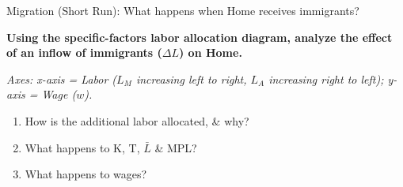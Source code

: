 \documentclass{beamer}
\begin{document}

\begin{frame}{Migration (Short Run): What happens when Home receives immigrants?}

\textbf{Using the specific-factors labor allocation diagram, analyze the effect of an inflow of immigrants ($\Delta L$) on Home.}

\vspace{0.2cm}

\textit{Axes: x-axis = Labor ($L_M$ increasing left to right, $L_A$ increasing right to left); y-axis = Wage ($w$).}

\vspace{0.3cm}

\begin{enumerate}
    \item How is the additional labor allocated, \& why?
    \item What happens to K, T, $\bar{L}$ \& MPL?
    \item What happens to wages?
\end{enumerate}

\end{frame}


\end{document}
